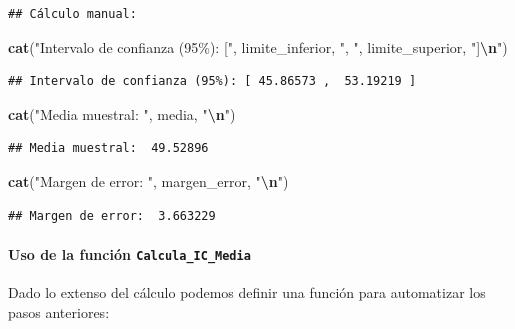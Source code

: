 \documentclass[
]{article}
\newenvironment{Shaded}{\begin{snugshade}}{\end{snugshade}}
\newcommand{\FunctionTok}[1]{\textcolor[rgb]{0.13,0.29,0.53}{\textbf{#1}}}
\newcommand{\NormalTok}[1]{#1}
\newcommand{\SpecialCharTok}[1]{\textcolor[rgb]{0.81,0.36,0.00}{\textbf{#1}}}
\newcommand{\StringTok}[1]{\textcolor[rgb]{0.31,0.60,0.02}{#1}}
\begin{document}
\begin{verbatim}
## Cálculo manual:
\end{verbatim}

\begin{Shaded}
\begin{Highlighting}[]
\FunctionTok{cat}\NormalTok{(}\StringTok{"Intervalo de confianza (95\%): ["}\NormalTok{, limite\_inferior, }\StringTok{", "}\NormalTok{, limite\_superior, }\StringTok{"]}\SpecialCharTok{\textbackslash{}n}\StringTok{"}\NormalTok{)}
\end{Highlighting}
\end{Shaded}

\begin{verbatim}
## Intervalo de confianza (95%): [ 45.86573 ,  53.19219 ]
\end{verbatim}

\begin{Shaded}
\begin{Highlighting}[]
\FunctionTok{cat}\NormalTok{(}\StringTok{"Media muestral: "}\NormalTok{, media, }\StringTok{"}\SpecialCharTok{\textbackslash{}n}\StringTok{"}\NormalTok{)}
\end{Highlighting}
\end{Shaded}

\begin{verbatim}
## Media muestral:  49.52896
\end{verbatim}

\begin{Shaded}
\begin{Highlighting}[]
\FunctionTok{cat}\NormalTok{(}\StringTok{"Margen de error: "}\NormalTok{, margen\_error, }\StringTok{"}\SpecialCharTok{\textbackslash{}n}\StringTok{"}\NormalTok{)}
\end{Highlighting}
\end{Shaded}

\begin{verbatim}
## Margen de error:  3.663229
\end{verbatim}

\paragraph{\texorpdfstring{Uso de la función \texttt{Calcula\_IC\_Media}}{Uso de la función Calcula\_IC\_Media}}\label{uso-de-la-funciuxf3n-calcula_ic_media}

Dado lo extenso del cálculo podemos definir una función para automatizar los pasos anteriores:
\end{document}
